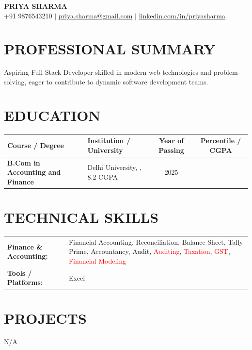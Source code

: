 \documentclass[9.5pt,a4paper]{extarticle}
\begin{document}
\begin{center}
{\Large \textbf{PRIYA SHARMA}} \\ \vspace{2pt}
+91 9876543210 \quad $|$ \quad \href{mailto:priya.sharma@gmail.com}{priya.sharma@gmail.com} \quad $|$ \quad \href{https://linkedin.com/in/priyasharma}{linkedin.com/in/priyasharma}
\end{center}

\section*{PROFESSIONAL SUMMARY}
Aspiring Full Stack Developer skilled in modern web technologies and problem-solving, eager to contribute to dynamic software development teams.

\section*{EDUCATION}
{\small
\renewcommand{\arraystretch}{1.18}
\noindent\begin{tabularx}{\textwidth}{|p{1.7in}|X|c|c|}
\hline
\textbf{Course / Degree} & \textbf{Institution / University} & \textbf{Year of Passing} & \textbf{Percentile / CGPA} \\ \hline
\textbf{B.Com in Accounting and Finance} & Delhi University, , 8.2 CGPA & 2025 & - \\ \hline
\end{tabularx}
}\vspace{4pt}


\section*{TECHNICAL SKILLS}
\begin{tabular}{@{}p{2.3in}p{4.6in}@{}}
\textbf{Finance \& Accounting:} & Financial Accounting, Reconciliation, Balance Sheet, Tally Prime, Accountancy, Audit, \textcolor{red}{Auditing}, \textcolor{red}{Taxation}, \textcolor{red}{GST}, \textcolor{red}{Financial Modeling} \\
\textbf{Tools / Platforms:} & Excel \\
\end{tabular}



\section*{PROJECTS}
N/A


\end{document}
